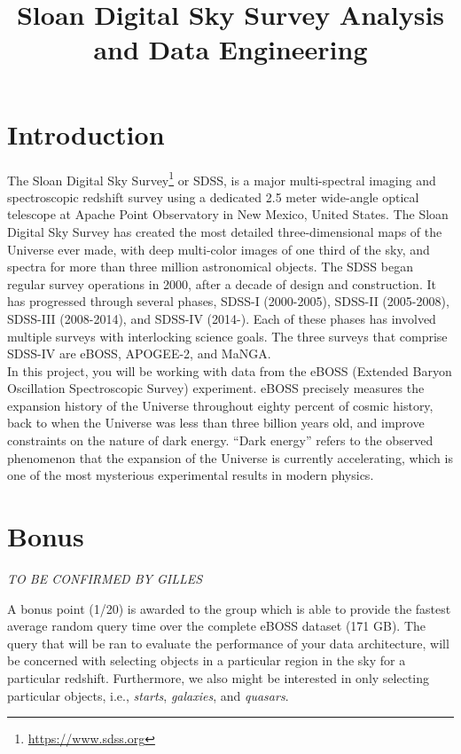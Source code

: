 

\title{Sloan Digital Sky Survey Analysis and Data Engineering}
\maketitle

\section{Introduction}
\label{sec:introduction}

The Sloan Digital Sky Survey\footnote{\href{https://www.sdss.org}{https://www.sdss.org}} or SDSS, is a major multi-spectral imaging and spectroscopic redshift survey using a dedicated 2.5 meter wide-angle optical telescope at Apache Point Observatory in New Mexico, United States. The Sloan Digital Sky Survey has created the most detailed three-dimensional maps of the Universe ever made, with deep multi-color images of one third of the sky, and spectra for more than three million astronomical objects. The SDSS began regular survey operations in 2000, after a decade of design and construction.  It has progressed through several phases, SDSS-I (2000-2005), SDSS-II (2005-2008), SDSS-III (2008-2014), and SDSS-IV (2014-).  Each of these phases has involved multiple surveys with interlocking science goals.  The three surveys that comprise SDSS-IV are eBOSS, APOGEE-2, and MaNGA.\\

In this project, you will be working with data from the eBOSS (Extended Baryon Oscillation Spectroscopic Survey) experiment. eBOSS precisely measures the expansion history of the Universe throughout eighty percent of cosmic history, back to when the Universe was less than three billion years old, and improve constraints on the nature of dark energy. “Dark energy” refers to the observed phenomenon that the expansion of the Universe is currently accelerating, which is one of the most mysterious experimental results in modern physics.

\section{Bonus}
\label{sec:bonus}

\emph{TO BE CONFIRMED BY GILLES}

A bonus point (1/20) is awarded to the group which is able to provide the fastest average random query time over the complete eBOSS dataset (171 GB). The query that will be ran to evaluate the performance of your data architecture, will be concerned with selecting objects in a particular region in the sky for a particular redshift. Furthermore, we also might be interested in only selecting particular objects, i.e., \emph{starts}, \emph{galaxies}, and \emph{quasars}.


